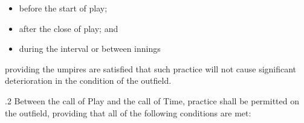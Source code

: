 \documentclass[12pt]{article}
\begin{document}
\vspace{\baselineskip}
\begin{itemize}
	\item {\fontsize{9pt}{10.8pt}\selectfont before the start of play;\par}\par


\vspace{\baselineskip}
	\item {\fontsize{9pt}{10.8pt}\selectfont after the close of play; and\par}\par


\vspace{\baselineskip}
	\item {\fontsize{9pt}{10.8pt}\selectfont during the interval or between innings\par}
\end{itemize}\par


\vspace{\baselineskip}
\begin{adjustwidth}{0.5in}{0.1in}
{\fontsize{9pt}{10.8pt}\selectfont providing the umpires are satisfied that such practice will not cause significant deterioration in the condition of the outfield.\par}\par

\end{adjustwidth}


\vspace{\baselineskip}
\begin{adjustwidth}{0.5in}{0.07in}
{\fontsize{9pt}{10.8pt}.2 \tabto{0.49in} Between the call of Play and the call of Time, practice shall be permitted on the outfield, providing that all of the following conditions are met:\par}\par

\end{adjustwidth}
\end{document}
